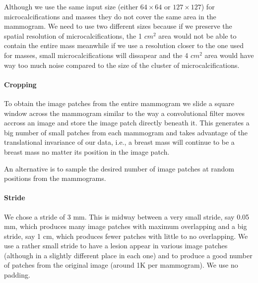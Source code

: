 Although we use the same input size (either $64 \times 64$ or $127 \times 127$) for microcalcifications and masses they do not cover the same area in the mammogram. We need to use two different sizes because if we preserve the spatial resolution of microcalcifications, the 1 $cm^2$ area would not be able to contain the entire mass meanwhile if we use a resolution closer to the one used for masses, small microcalcifications will dissapear and the 4 $cm^2$ area would have way too much noise compared to the size of the cluster of microcalcifications.

\paragraph{Cropping}
To obtain the image patches from the entire mammogram we slide a square window across the mammogram similar to the way a convolutional filter moves accross an image and store the image patch directly beneath it. This generates a big number of small patches from each mammogram and takes advantage of the translational invariance of our data, i.e., a breast mass will continue to be a breast mass no matter its position in the image patch.

An alternative is to sample the desired number of image patches at random positions from the mammograms.

\paragraph{Stride}
We chose a stride of 3 mm. This is midway between a very small stride, say 0.05 mm, which produces many image patches with maximum overlapping and a big stride, say 1 cm, which produces fewer patches with little to no overlapping. We use a rather small stride to have a lesion appear in various image patches (although in a slightly different place in each one) and to produce a good number of patches from the original image (around 1K per mammogram). We use no padding.

